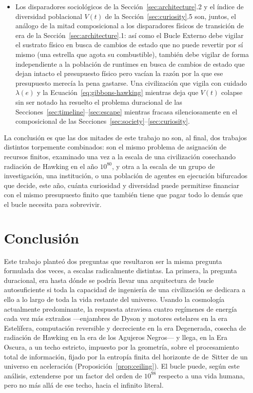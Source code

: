 \documentclass[11pt]{article}
\begin{document}
\begin{itemize}[leftmargin=1.5em]
    \item Los disparadores sociológicos de la Sección~\ref{sec:architecture}.2 y el índice de diversidad poblacional $V(t)$ de la Sección~\ref{sec:curiosity}.5 son, juntos, el análogo de la mitad composicional a los disparadores físicos de transición de era de la Sección~\ref{sec:architecture}.1: así como el Bucle Externo debe vigilar el sustrato físico en busca de cambios de estado que no puede revertir por sí mismo (una estrella que agota su combustible), también debe vigilar de forma independiente a la población de runtimes en busca de cambios de estado que dejan intacto el presupuesto físico pero vacían la razón por la que ese presupuesto merecía la pena gastarse. Una civilización que vigila con cuidado $\lambda(e)$ y la Ecuación~\ref{eq:gibbons-hawking} mientras deja que $V(t)$ colapse sin ser notado ha resuelto el problema duracional de las Secciones~\ref{sec:timeline}--\ref{sec:escape} mientras fracasa silenciosamente en el composicional de las Secciones~\ref{sec:society}--\ref{sec:curiosity}.
\end{itemize}

\noindent La conclusión es que las dos mitades de este trabajo no son, al final, dos trabajos distintos torpemente combinados: son el mismo problema de asignación de recursos finitos, examinado una vez a la escala de una civilización cosechando radiación de Hawking en el año $10^{80}$, y otra a la escala de un grupo de investigación, una institución, o una población de agentes en ejecución bifurcados que decide, este año, cuánta curiosidad y diversidad puede permitirse financiar con el mismo presupuesto finito que también tiene que pagar todo lo demás que el bucle necesita para sobrevivir.

\section{Conclusión}
\label{sec:conclusion}

Este trabajo planteó dos preguntas que resultaron ser la misma pregunta formulada dos veces, a escalas radicalmente distintas. La primera, la pregunta duracional, era hasta dónde se podría llevar una arquitectura de bucle autosuficiente si toda la capacidad de ingeniería de una civilización se dedicara a ello a lo largo de toda la vida restante del universo. Usando la cosmología actualmente predominante, la respuesta atraviesa cuatro regímenes de energía cada vez más extraños —enjambres de Dyson y motores estelares en la era Estelífera, computación reversible y decreciente en la era Degenerada, cosecha de radiación de Hawking en la era de los Agujeros Negros— y llega, en la Era Oscura, a un techo estricto, impuesto por la geometría, sobre el procesamiento total de información, fijado por la entropía finita del horizonte de de~Sitter de un universo en aceleración (Proposición~\ref{prop:ceiling}). El bucle puede, según este análisis, extenderse por un factor del orden de $10^{98}$ respecto a una vida humana, pero no más allá de ese techo, hacia el infinito literal.
\end{document}
